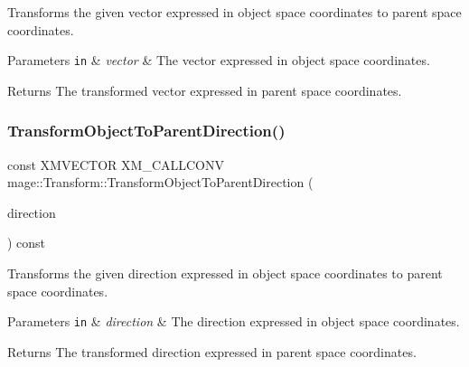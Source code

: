 Transforms the given vector expressed in object space coordinates to parent space coordinates.


\begin{DoxyParams}[1]{Parameters}
\mbox{\tt in}  & {\em vector} & The vector expressed in object space coordinates. \\
\hline
\end{DoxyParams}
\begin{DoxyReturn}{Returns}
The transformed vector expressed in parent space coordinates. 
\end{DoxyReturn}
\mbox{\label{classmage_1_1_transform_afddbd41527257bf0ed20ceafa19b49c9}} 
\subsubsection{\texorpdfstring{Transform\+Object\+To\+Parent\+Direction()}{TransformObjectToParentDirection()}}
{\footnotesize\ttfamily const X\+M\+V\+E\+C\+T\+OR X\+M\+\_\+\+C\+A\+L\+L\+C\+O\+NV mage\+::\+Transform\+::\+Transform\+Object\+To\+Parent\+Direction (\begin{DoxyParamCaption}\item[{F\+X\+M\+V\+E\+C\+T\+OR}]{direction }\end{DoxyParamCaption}) const\hspace{0.3cm}{\ttfamily [noexcept]}}

Transforms the given direction expressed in object space coordinates to parent space coordinates.


\begin{DoxyParams}[1]{Parameters}
\mbox{\tt in}  & {\em direction} & The direction expressed in object space coordinates. \\
\hline
\end{DoxyParams}
\begin{DoxyReturn}{Returns}
The transformed direction expressed in parent space coordinates. 
\end{DoxyReturn}
\mbox{\label{classmage_1_1_transform_a2d93dac4ae0b5b2723d2fbce077da85f}} 
